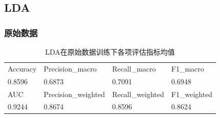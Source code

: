 \documentclass[10pt]{article}
\begin{document}
\subsection{LDA}
\subsubsection*{原始数据}
\begin{table}[H]
  \centering
  \caption{LDA在原始数据训练下各项评估指标均值}
  \begin{tabular}{llll}
  \toprule
  Accuracy & Precision\_macro & Recall\_macro & F1\_macro \\
  0.8596 & 0.6873 & 0.7091 & 0.6948 \\
  \midrule
  AUC & Precision\_weighted & Recall\_weighted & F1\_weighted \\
  0.9244 & 0.8674 & 0.8596 & 0.8624 \\
  \bottomrule
  \end{tabular}
\end{table}
\end{document}
